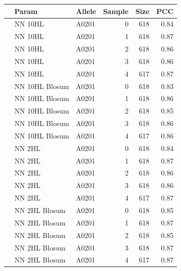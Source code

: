 \documentclass[presentation]{beamer}   %
\begin{document}
\begin{frame}
\begin{table}[hb]\scriptsize
\begin{center}

\begin{tabular}{rllrrr}
  \hline
 & Param & Allele & Sample & Size & PCC \\ 
  \hline
   & NN 10HL & A0201 &   0 & 618 & 0.84 \\ 
   & NN 10HL & A0201 &   1 & 618 & 0.87 \\ 
   & NN 10HL & A0201 &   2 & 618 & 0.86 \\ 
   & NN 10HL & A0201 &   3 & 618 & 0.86 \\ 
   & NN 10HL & A0201 &   4 & 617 & 0.87 \\ 
   \hline
   & NN 10HL Blosum & A0201 &   0 & 618 & 0.83 \\ 
   & NN 10HL Blosum & A0201 &   1 & 618 & 0.86 \\ 
   & NN 10HL Blosum & A0201 &   2 & 618 & 0.85 \\ 
   & NN 10HL Blosum & A0201 &   3 & 618 & 0.86 \\ 
   & NN 10HL Blosum & A0201 &   4 & 617 & 0.86 \\ 
   \hline
   & NN 2HL & A0201 &   0 & 618 & 0.84 \\ 
   & NN 2HL & A0201 &   1 & 618 & 0.87 \\ 
   & NN 2HL & A0201 &   2 & 618 & 0.86 \\ 
   & NN 2HL & A0201 &   3 & 618 & 0.86 \\ 
   & NN 2HL & A0201 &   4 & 617 & 0.87 \\ 
   \hline
   & NN 2HL Blosum & A0201 &   0 & 618 & 0.85 \\ 
   & NN 2HL Blosum & A0201 &   1 & 618 & 0.87 \\ 
   & NN 2HL Blosum & A0201 &   2 & 618 & 0.85 \\ 
   & NN 2HL Blosum & A0201 &   3 & 618 & 0.87 \\ 
   & NN 2HL Blosum & A0201 &   4 & 617 & 0.87 \\ 
   \hline
\end{tabular}
\end{center}

\end{table}
\end{frame}
\end{document}

